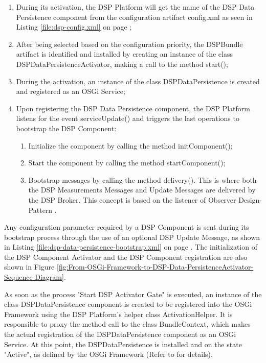 \begin{enumerate}
  \item During its activation, the DSP Platform will get the name of the
  DSP Data Persistence component from the configuration artifact config.xml as
  seen in Listing \ref{file:dsp-config.xml} on page
  \pageref{file:dsp-config.xml};
  \item After being selected based on the configuration priority, the 
  DSPBundle artifact is identified and installed by creating an instance of the
  class DSPDataPersistenceActivator, making a call to the method start();
  \item During the activation, an instance of the class DSPDataPersistence
  is created and registered as an OSGi Service;
  \item Upon registering the DSP Data Persistence component, the DSP Platform
  listens for the event serviceUpdate() and triggers the last operations to
  bootstrap the DSP Component:
   \begin{enumerate}
      \item Initialize the component by calling the method initComponent();
      \item Start the component by calling the method startComponent();
      \item Bootstrap messages by calling the method delivery(). This is where
      both the DSP Measurements Messages and Update Messages are delivered by
      the DSP Broker. This concept is based on the listener of Observer
      Design-Pattern \cite{gof}.
   \end{enumerate}
\end{enumerate}

Any configuration parameter required by a DSP Component is sent during its
bootstrap process through the use of an optional DSP Update Message, as shown
in Listing \ref{file:dsp-data-persistence-bootstrap.xml} on page
\pageref{file:dsp-data-persistence-bootstrap.xml}. The initialization of the
DSP Component Activator and the DSP Component registration are also shown in
Figure
\ref{fig:From-OSGi-Framework-to-DSP-Data-PersistenceActivator-Sequence-Diagram}.

As soon as the process "Start DSP Activator Gate" is executed, an instance of
the class DSPDataPersistence component is created to be registered into the
OSGi Framework using the DSP Platform's helper class ActivationHelper. It is
responsible to proxy the method call to the class BundleContext, which makes
the actual registration of the DSPDataPersistence component as an OSGi
Service. At this point, the DSPDataPersistence is installed and on the state
"Active", as defined by the OSGi Framework (Refer to
\cite{netbeams-dsp-architecture} for details).


